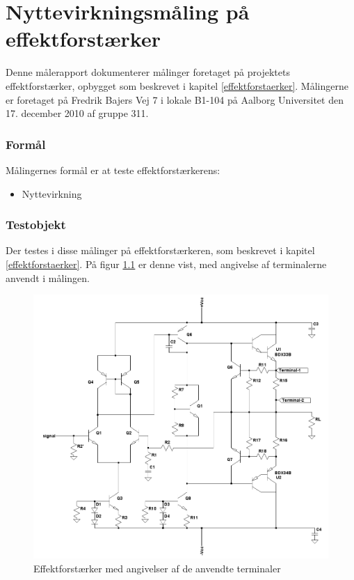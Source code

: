 \chapter{Nyttevirkningsmåling på effektforstærker}
\label{maalejournal-effekt}

Denne målerapport dokumenterer målinger foretaget på projektets effektforstærker, opbygget som beskrevet i kapitel \ref{effektforstaerker}. Målingerne er foretaget på Fredrik Bajers Vej 7 i lokale B1-104 på Aalborg Universitet den 17. december 2010 af gruppe 311.

\subsection*{Formål}

Målingernes formål er at teste effektforstærkerens:
\begin{itemize}
\item Nyttevirkning
\end{itemize}

\subsection*{Testobjekt}
Der testes i disse målinger på effektforstærkeren, som beskrevet i kapitel \ref{effektforstaerker}. På figur \ref{fig:testob_efforstaerker_nytte} er denne vist, med angivelse af terminalerne anvendt i målingen.

\begin{figure}[h]
\centering
\includegraphics[width=\textwidth]{maalerapporter/effektforstaerker/effektforstaerker_nyttevirkning_test.png}
\caption{Effektforstærker med angivelser af de anvendte terminaler}
\label{fig:testob_efforstaerker_nytte}
\end{figure}

